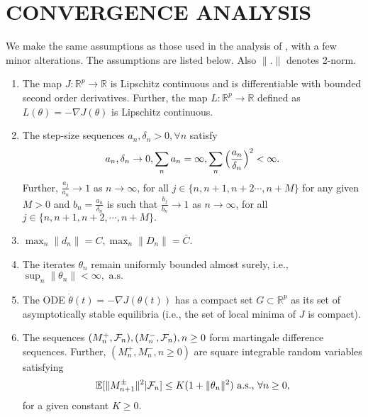 \section{CONVERGENCE ANALYSIS}
\label{sec:convergenceresults}
We make the same assumptions as those used in the analysis of \cite{spall}, with a 
few minor alterations. The assumptions are listed below. Also $\|.\|$ denotes 2-norm.
\begin{enumerate}[label= \textbf{(A\arabic*)}]
 \item The map $J:\mathbb{R}^p \rightarrow \mathbb{R}$ is Lipschitz continuous and 
 is differentiable with bounded second order derivatives. Further, 
 the map $L:\mathbb{R}^p \rightarrow \mathbb{R}$ defined as 
 $L(\theta)=-\nabla J(\theta)$ is Lipschitz continuous.
 \item The step-size sequences $a_n, \delta_n >0, \forall n $  satisfy
 \begin{equation*}\label{stepsizes}
 a_n,\delta_n \rightarrow 0 , \sum_na_n=\infty,
 \sum_n \Big{(}\frac{a_n}{\delta_n}\Big{)}^2<\infty.
 \end{equation*}
 Further, $\frac{a_j}{a_n}\rightarrow 1$ as $n\rightarrow \infty$, for all
 $j \in \{n,n+1,n+2\cdots,n+M\}$ for any given $M>0$ and $b_n=\frac{a_n}{\delta_n}$ is 
 such that $\frac{b_j}{b_n}\rightarrow 1$ as $n\rightarrow \infty$, for all
 $j \in \{n,n+1,n+2,\cdots,n+M\}.$

 \item $\max_n \|d_n\|= C, \max_n \|D_n\|= \bar{C}$. 
 
 \item The iterates $\theta_n$ remain uniformly bounded almost surely, i.e.,
 $ \sup_n\|\theta_n\|<\infty, \text{ a.s.}$

 \item The ODE $\dot{\theta}(t)=-\nabla J(\theta(t))$ has a compact set 
 $G \subset \mathbb{R}^p$ as its set of asymptotically stable equilibria
 (i.e., the set of local minima of $J$ is compact).
 
 
 \item The sequences $(M_{n}^{+},\mathcal{F}_n),(M_{n}^{-},\mathcal{F}_n), n\geq0 $ form martingale difference sequences.
 Further, $(M_{n}^{+},M_{n}^{-},n\geq0)$ are square integrable random variables satisfying
 $$\mathbb{E}[\|M_{n+1}^{\pm}\|^2|\mathcal{F}_n]\leq K(1+\|\theta_n\|^2) \text{ a.s., } \forall n\geq0,$$
 for a given constant $K \geq 0.$
 
\end{enumerate}
